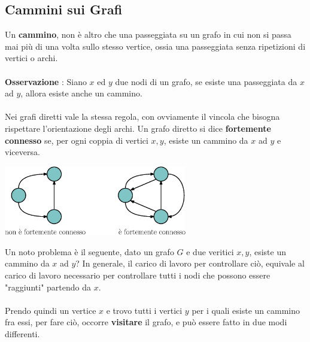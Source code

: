 \documentclass[12pt, letterpaper]{article}
\newcommand{\acc}{\\\hphantom{}\\}
\begin{document}
\subsection{Cammini sui Grafi}
Un \textbf{cammino}, non è altro che una passeggiata su un grafo in cui non
si passa mai più di una volta sullo stesso vertice, ossia una passeggiata
senza ripetizioni di vertici o archi. \acc
\textbf{Osservazione} : Siano $x$ ed $y$ due nodi di un grafo, se esiste
una passeggiata da $x$ ad $y$, allora esiste anche un cammino.\acc
Nei grafi diretti vale la stessa regola, con ovviamente il vincola che bisogna rispettare
l'orientazione degli archi. Un grafo diretto si dice \textbf{fortemente connesso}
se, per ogni coppia di vertici \(x,y\), esiste un cammino da \(x\) ad \(y\)
e viceversa. \begin{center}
    \includegraphics[width=0.6\textwidth ]{images/fortConnesso.eps}
\end{center}
Un noto problema è il seguente, dato un grafo \(G\) e due veritici \(x,y\), esiste un cammino da \(x\) ad \(y\)? In generale,
il carico di lavoro per controllare ciò, equivale al carico di lavoro necessario per controllare tutti i nodi che possono essere
"raggiunti" partendo da \(x\).\acc
Prendo quindi un vertice \(x\) e trovo tutti i vertici \(y\) per i quali esiste un cammino fra essi, per fare ciò, occorre
\textbf{visitare} il grafo, e può essere fatto in due modi differenti.
\end{document}

